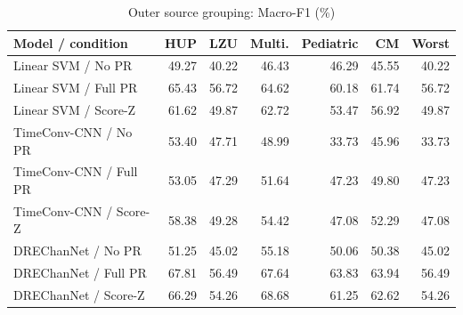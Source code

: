 \begin{table}[t]
\centering
\caption{Outer source grouping: Macro-F1 (\%)}
\small
\begin{tabular}{lrrrrrr}
\toprule
Model / condition & HUP & LZU & Multi. & Pediatric & CM & Worst \\
\midrule
Linear SVM / No PR & 49.27 & 40.22 & 46.43 & 46.29 & 45.55 & 40.22 \\
Linear SVM / Full PR & 65.43 & 56.72 & 64.62 & 60.18 & 61.74 & 56.72 \\
Linear SVM / Score-Z & 61.62 & 49.87 & 62.72 & 53.47 & 56.92 & 49.87 \\
TimeConv-CNN / No PR & 53.40 & 47.71 & 48.99 & 33.73 & 45.96 & 33.73 \\
TimeConv-CNN / Full PR & 53.05 & 47.29 & 51.64 & 47.23 & 49.80 & 47.23 \\
TimeConv-CNN / Score-Z & 58.38 & 49.28 & 54.42 & 47.08 & 52.29 & 47.08 \\
DREChanNet / No PR & 51.25 & 45.02 & 55.18 & 50.06 & 50.38 & 45.02 \\
DREChanNet / Full PR & 67.81 & 56.49 & 67.64 & 63.83 & 63.94 & 56.49 \\
DREChanNet / Score-Z & 66.29 & 54.26 & 68.68 & 61.25 & 62.62 & 54.26 \\
\bottomrule
\end{tabular}
\end{table}
